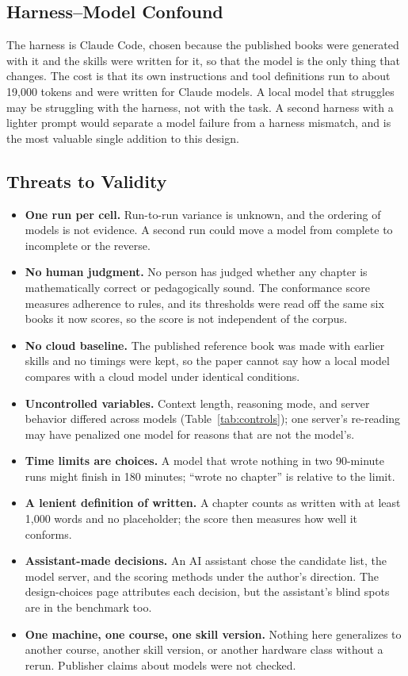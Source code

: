 \documentclass[11pt]{article}
\begin{document}
\subsection{Harness--Model Confound}

The harness is Claude Code, chosen because the published books were generated with it and the skills were written for it, so that the model is the only thing that changes. The cost is that its own instructions and tool definitions run to about 19,000 tokens and were written for Claude models. A local model that struggles may be struggling with the harness, not with the task. A second harness with a lighter prompt would separate a model failure from a harness mismatch, and is the most valuable single addition to this design.

\subsection{Threats to Validity}

\begin{itemize}
\item \textbf{One run per cell.} Run-to-run variance is unknown, and the ordering of models is not evidence. A second run could move a model from complete to incomplete or the reverse.
\item \textbf{No human judgment.} No person has judged whether any chapter is mathematically correct or pedagogically sound. The conformance score measures adherence to rules, and its thresholds were read off the same six books it now scores, so the score is not independent of the corpus.
\item \textbf{No cloud baseline.} The published reference book was made with earlier skills and no timings were kept, so the paper cannot say how a local model compares with a cloud model under identical conditions.
\item \textbf{Uncontrolled variables.} Context length, reasoning mode, and server behavior differed across models (Table~\ref{tab:controls}); one server's re-reading may have penalized one model for reasons that are not the model's.
\item \textbf{Time limits are choices.} A model that wrote nothing in two 90-minute runs might finish in 180 minutes; ``wrote no chapter'' is relative to the limit.
\item \textbf{A lenient definition of written.} A chapter counts as written with at least 1,000 words and no placeholder; the score then measures how well it conforms.
\item \textbf{Assistant-made decisions.} An AI assistant chose the candidate list, the model server, and the scoring methods under the author's direction. The design-choices page attributes each decision, but the assistant's blind spots are in the benchmark too.
\item \textbf{One machine, one course, one skill version.} Nothing here generalizes to another course, another skill version, or another hardware class without a rerun. Publisher claims about models were not checked.
\end{itemize}
\end{document}
